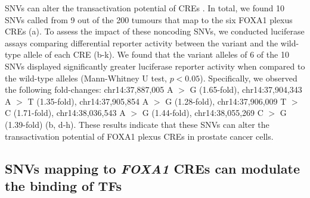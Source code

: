 SNVs can alter the transactivation potential of CREs \cite{baileyNoncodingSomaticInherited2016,rheinbayRecurrentFunctionalRegulatory2017,zhangIntegrativeFunctionalGenomics2012,huangHighlyRecurrentTERT2013,hornTERTPromoterMutations2013,fuxmanbassHumanGeneCenteredTranscription2015,zhouEmergenceNoncodingCancer2016,feiginRecurrentNoncodingRegulatory2017,khuranaRoleNoncodingSequence2016,cowper-sal*lariBreastCancerRisk2012}.
In total, we found 10 SNVs called from 9 out of the 200 tumours that map to the six FOXA1 plexus CREs (a).
To assess the impact of these noncoding SNVs, we conducted luciferase assays comparing differential reporter activity between the variant and the wild-type allele of each CRE (b-k).
We found that the variant alleles of 6 of the 10 SNVs displayed significantly greater luciferase reporter activity when compared to the wild-type alleles (Mann-Whitney U test, $p<0.05$).
Specifically, we observed the following fold-changes: chr14:37,887,005 A $>$ G (1.65-fold), chr14:37,904,343 A $>$ T (1.35-fold), chr14:37,905,854 A $>$ G (1.28-fold), chr14:37,906,009 T $>$ C (1.71-fold), chr14:38,036,543 A $>$ G (1.44-fold), chr14:38,055,269 C $>$ G (1.39-fold) (b, d-h).
These results indicate that these SNVs can alter the transactivation potential of FOXA1 plexus CREs in prostate cancer cells.


\subsection{SNVs mapping to \emph{FOXA1} CREs can modulate the binding of TFs}

